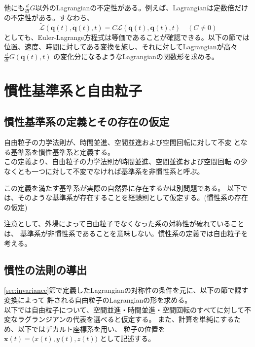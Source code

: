 \documentclass[a4paper,11pt]{ltjsarticle}
\newcommand{\qv}{\bm{q}}
\newcommand{\La}{\mathcal{L}}
\newcommand{\Laq}{\mathcal{L}(\qv(t),\dot{\qv}(t),t)}
\begin{document}
他にも$\frac{d}{dt}G$以外のLagrangianの不定性がある。例えば、Lagrangianは定数倍だけの不定性がある。すなわち、
\[
\tilde{\La}(\qv(t),\dot{\qv}(t),t)=C\Laq \quad (C\ne 0)
\]
としても、Euler-Lagrange方程式は等価であることが確認できる。以下の節では
位置、速度、時間に対してある変換を施し、それに対してLagrangianが高々 $\frac{d}{dt}G(\qv(t),t)$
の変化分になるようなLagrangianの関数形を求める。 

\section{慣性基準系と自由粒子}

\subsection{慣性基準系の定義とその存在の仮定}
\label{sec:inertial}
自由粒子の力学法則が、時間並進、空間並進および空間回転に対して不変
となる基準系を慣性基準系と定義する。
\\この定義より、自由粒子の力学法則が時間並進、空間並進および空間回転
の少なくとも一つに対して不変でなければ基準系を非慣性系と呼ぶ。

この定義を満たす基準系が実際の自然界に存在するかは別問題である。
以下では、そのような基準系が存在することを経験則として仮定する。(慣性系の存在の仮定)

注意として、外場によって自由粒子でなくなった系の対称性が破れていることは、
基準系が非慣性系であることを意味しない。慣性系の定義では自由粒子を考える。

\subsection{慣性の法則の導出}
\ref{sec:invariance}節で定義したLagrangianの対称性の条件を元に、以下の節で課す変換によって
許される自由粒子のLagrangianの形を求める。
\\以下では自由粒子について、空間並進・時間並進・空間回転のすべてに対して不変なラグランジアンの代表を選べると仮定する。
また、計算を単純にするため、以下ではデカルト座標系を用い、
粒子の位置を $\bm{x}(t)=\bigl(x(t),y(t),z(t)\bigr)$ として記述する。
\end{document}
